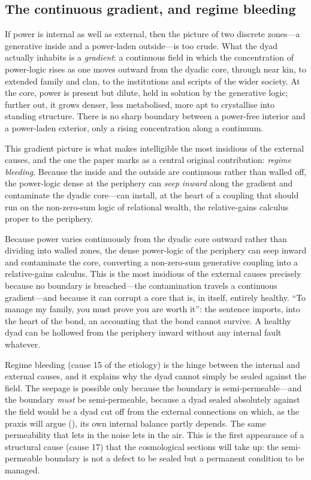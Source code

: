 \subsection{The continuous gradient, and regime bleeding}
\label{p17:sub:ir-gradient}

If power is internal as well as external, then the picture of two discrete zones---a generative inside and a power-laden outside---is too crude. What the dyad actually inhabits is a \emph{gradient}: a continuous field in which the concentration of power-logic rises as one moves outward from the dyadic core, through near kin, to extended family and clan, to the institutions and scripts of the wider society. At the core, power is present but dilute, held in solution by the generative logic; further out, it grows denser, less metabolised, more apt to crystallise into standing structure. There is no sharp boundary between a power-free interior and a power-laden exterior, only a rising concentration along a continuum.

This gradient picture is what makes intelligible the most insidious of the external causes, and the one the paper marks as a central original contribution: \emph{regime bleeding}. Because the inside and the outside are continuous rather than walled off, the power-logic dense at the periphery can \emph{seep inward} along the gradient and contaminate the dyadic core---can install, at the heart of a coupling that should run on the non-zero-sum logic of relational wealth, the relative-gains calculus proper to the periphery.

\begin{claim}
Because power varies continuously from the dyadic core outward rather than dividing into walled zones, the dense power-logic of the periphery can seep inward and contaminate the core, converting a non-zero-sum generative coupling into a relative-gains calculus. This is the most insidious of the external causes precisely because no boundary is breached---the contamination travels a continuous gradient---and because it can corrupt a core that is, in itself, entirely healthy. ``To manage my family, you must prove you are worth it'': the sentence imports, into the heart of the bond, an accounting that the bond cannot survive. A healthy dyad can be hollowed from the periphery inward without any internal fault whatever.
\end{claim}

\noindent
Regime bleeding (cause 15 of the etiology) is the hinge between the internal and external causes, and it explains why the dyad cannot simply be sealed against the field. The seepage is possible only because the boundary is semi-permeable---and the boundary \emph{must} be semi-permeable, because a dyad sealed absolutely against the field would be a dyad cut off from the external connections on which, as the praxis will argue (), its own internal balance partly depends. The same permeability that lets in the noise lets in the air. This is the first appearance of a structural cause (cause 17) that the cosmological sections will take up: the semi-permeable boundary is not a defect to be sealed but a permanent condition to be managed.

